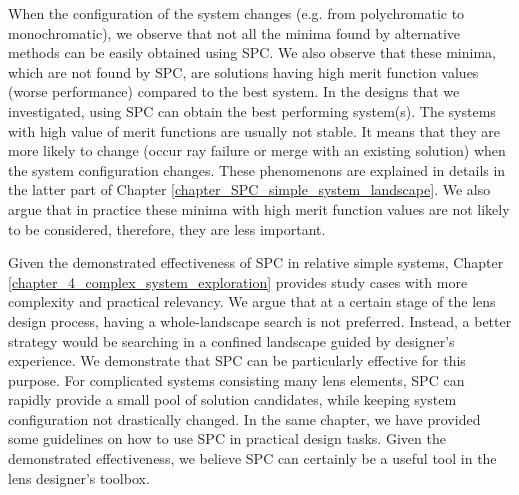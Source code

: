 When the configuration of the system changes (e.g. from polychromatic to monochromatic), we observe that not all the minima found by alternative methods can be easily obtained using SPC. We also observe that these minima, which are not found by SPC, are solutions having high merit function values (worse performance) compared to the best system. In the designs that we investigated, using SPC can obtain the best performing system(s). The systems with high value of merit functions are usually not stable. It means that they are more likely to change (occur ray failure or merge with an existing solution) when the system configuration changes. These phenomenons are explained in details in the latter part of Chapter \ref{chapter_SPC_simple_system_landscape}. We also argue that in practice these minima with high merit function values are not likely to be considered, therefore, they are less important.   

Given the demonstrated effectiveness of SPC in relative simple systems, Chapter \ref{chapter_4_complex_system_exploration} provides study cases with more complexity and practical relevancy. We argue that at a certain stage of the lens design process, having a whole-landscape search is not preferred. Instead, a better strategy would be searching in a confined landscape guided by designer's experience. We demonstrate that SPC can be particularly effective for this purpose. For complicated systems consisting many lens elements, SPC can rapidly provide a small pool of solution candidates, while keeping system configuration not drastically changed. In the same chapter, we have provided some guidelines on how to use SPC in practical design tasks. Given the demonstrated effectiveness, we believe SPC can certainly be a useful tool in the lens designer's toolbox. 

